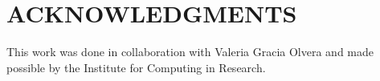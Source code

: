 \documentclass[letterpaper, 11 pt, conference]{ieeeconf}
\begin{document}
\addtolength{\textheight}{-12cm}   

\section*{ACKNOWLEDGMENTS}

This work was done in collaboration with Valeria Gracia Olvera and made possible by the Institute for Computing in Research. 

\printbibliography
\end{document}
